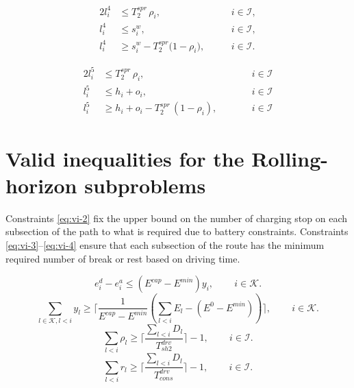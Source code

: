 \documentclass[preprint,12pt,3p]{elsarticle}
\begin{document}
\begin{alignat}{2}
    l_i^4 &\leq T^{spr}_{2}\, \rho_i,
    &\quad& \, i \in \mathcal{I}, \label{eq:l4_ub1}\\
    l_i^4 &\leq s_i^w,
    &\quad& \, i \in \mathcal{I}, \label{eq:l4_ub2}\\
    l_i^4 &\geq s_i^w - T^{spr}_{2}\bigl(1-\rho_i\bigr),
    &\quad& \, i \in \mathcal{I}. \label{eq:l4_lb}
\end{alignat}


\begin{alignat}{2}
    l^5_i &\leq T^{spr}_2\, \rho_i, &\qquad& i \in \mathcal I \label{eq:l5_1}\\
    l^5_i &\leq h_i + o_i, &\qquad& i \in \mathcal I \label{eq:l5_2}\\
    l^5_i &\geq h_i + o_i - T^{spr}_2\,(1 - \rho_i), &\qquad& i \in \mathcal I \label{eq:l5_3}
\end{alignat}


\section{Valid inequalities for the Rolling-horizon subproblems} \label{sec:valid_inequ}

Constraints \eqref{eq:vi-2} fix the upper bound on the number of charging stop on each subsection of the path to what is required due to battery constraints. Constraints \eqref{eq:vi-3}--\eqref{eq:vi-4} ensure that each subsection of the route has the minimum required number of break or rest based on driving time.

\begin{equation}
    e^d_i-e^a_i \leq (E^{cap}-E^{min})y_i,
    \qquad \, i \in \mathcal{K}.
    \label{eq:vi-1}
\end{equation}
\begin{equation}
    \sum_{l \in \mathcal K, l<i} y_l \geq \lceil \frac{1}{E^{cap}-E^{min}}(\sum_{l < i} E_l - (E^{0}-E^{min})) \rceil,
    \qquad \, i \in \mathcal{K}.
    \label{eq:vi-2}
\end{equation}
\begin{equation}
    \sum_{l<i} \rho_l \geq \lceil \frac{\sum_{l<i} D_l}{T^{drv}_{sh2}} \rceil-1,
    \qquad \, i \in \mathcal{I}.
    \label{eq:vi-3}
\end{equation}
\begin{equation}
    \sum_{l<i} r_l \geq \lceil \frac{\sum_{l<i} D_l}{T^{drv}_{cons}} \rceil -1,
    \qquad \, i \in \mathcal{I}.
    \label{eq:vi-4}
\end{equation}
\end{document}
